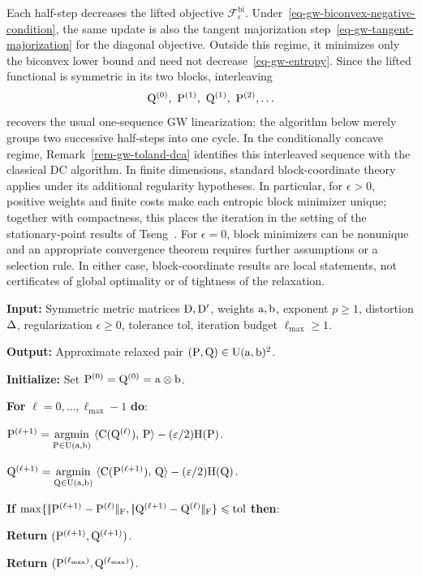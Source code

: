 Each half-step decreases the lifted objective $\mathcal F_\epsilon^{\mathrm{bi}}$. Under~\eqref{eq-gw-biconvex-negative-condition}, the same update is also the tangent majorization step~\eqref{eq-gw-tangent-majorization} for the diagonal objective. Outside this regime, it minimizes only the biconvex lower bound and need not decrease~\eqref{eq-gw-entropy}. Since the lifted functional is symmetric in its two blocks, interleaving
\[
	\Q^{(0)},\ \P^{(1)},\ \Q^{(1)},\ \P^{(2)},\ldots
\]
recovers the usual one-sequence GW linearization; the algorithm below merely groups two successive half-steps into one cycle. In the conditionally concave regime, Remark~\ref{rem-gw-toland-dca} identifies this interleaved sequence with the classical DC algorithm. In finite dimensions, standard block-coordinate theory applies under its additional regularity hypotheses. In particular, for $\epsilon>0$, positive weights and finite costs make each entropic block minimizer unique; together with compactness, this places the iteration in the setting of the stationary-point results of Tseng~\cite{Tseng2001}. For $\epsilon=0$, block minimizers can be nonunique and an appropriate convergence theorem requires further assumptions or a selection rule. In either case, block-coordinate results are local statements, not certificates of global optimality or of tightness of the relaxation.

\begin{algH}\label{alg:entropic-gromov-wasserstein}
\textbf{Input:} Symmetric metric matrices $\mathrm{D},\mathrm{D}'$, weights $\mathrm{a},\mathrm{b}$, exponent $p\geq1$, distortion $\Delta$, regularization $\epsilon\geq0$, tolerance $\mathrm{tol}$, iteration budget $\ell_{\max}\geq1$.

\textbf{Output:} Approximate relaxed pair $(\mathrm{P},\mathrm{Q})\in\mathrm{U}(\mathrm{a},\mathrm{b})^2$.

\textbf{Initialize:} Set $\mathrm{P}^{(0)}=\mathrm{Q}^{(0)}=\mathrm{a}\otimes\mathrm{b}$.

\textbf{For} $\ell=0,\ldots,\ell_{\max}-1$ \textbf{do}:
\begin{algblock}
\(\mathrm{P}^{(\ell+1)} = \underset{\mathrm{P}\in\mathrm{U}(\mathrm{a},\mathrm{b})}{\operatorname{argmin}}\;
\langle \mathrm{C}(\mathrm{Q}^{(\ell)}),\,\mathrm{P}\rangle-(\varepsilon/2)\mathrm{H}(\mathrm{P})\).

\(\mathrm{Q}^{(\ell+1)} = \underset{\mathrm{Q}\in\mathrm{U}(\mathrm{a},\mathrm{b})}{\operatorname{argmin}}\;
\langle \mathrm{C}(\mathrm{P}^{(\ell+1)}),\,\mathrm{Q}\rangle-(\varepsilon/2)\mathrm{H}(\mathrm{Q})\).

\textbf{If} $\max\{|\!| \mathrm{P}^{(\ell+1)}-\mathrm{P}^{(\ell)} |\!|_{\mathrm F},
|\!| \mathrm{Q}^{(\ell+1)}-\mathrm{Q}^{(\ell)} |\!|_{\mathrm F}\}\leqslant\mathrm{tol}$ \textbf{then}:
\begin{algblock}
\textbf{Return} $(\mathrm{P}^{(\ell+1)},\mathrm{Q}^{(\ell+1)})$.
\end{algblock}
\end{algblock}
\algreturnskip
\textbf{Return} $(\mathrm{P}^{(\ell_{\max})},\mathrm{Q}^{(\ell_{\max})})$.
\end{algH}

